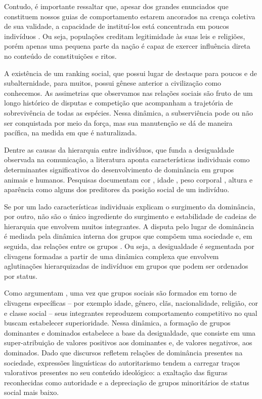\documentclass[
12pt,				%
openright,			%
twoside,			%
a4paper,			%
english,			%
french,				%
spanish,			%
brazil				%
]{abntex2}
\begin{document}
Contudo, é importante ressaltar que, apesar dos grandes enunciados que constituem nossos guias de comportamento estarem ancorados na crença coletiva de sua validade, a capacidade de instituí-los está concentrada em poucos indivíduos \cite{foucault1969archeologie}. Ou seja, populações creditam legitimidade às suas leis e religiões, porém apenas uma pequena parte da nação é capaz de exercer influência direta no conteúdo de constituições e ritos.

A existência de um ranking social, que possui lugar de destaque para poucos e de subalternidade, para muitos, possui gênese anterior a civilização como conhecemos. As assimetrias que observamos nas relações sociais são fruto de um longo histórico de disputas e competição que acompanham a trajetória de sobrevivência de todas as espécies. Nessa dinâmica, a subserviência pode ou não ser conquistada por meio da força, mas sua manutenção se dá de maneira pacífica, na medida em que é naturalizada. 

Dentre as causas da hierarquia entre indivíduos, que funda a desigualdade observada na comunicação, a literatura aponta características individuais como determinantes significativos do desenvolvimento de dominância em grupos animais e humanos. Pesquisas documentam cor \cite{bakker1983determinants}, idade \cite{cote2000dominance, bohlin2001determinants}, peso corporal \cite{morgan2000predictors}, altura \cite{huang2002camera} e aparência \cite{lawson2010looking, lodge2013rationalizing} como alguns dos preditores da posição social de um indivíduo.    

Se por um lado características individuais explicam o surgimento da dominância, por outro, não são o único ingrediente do surgimento e estabilidade de cadeias de hierarquia que envolvem muitos integrantes. A disputa pelo lugar de dominância é mediada pela dinâmica interna dos grupos que compõem uma sociedade \cite{ridgeway1989dominance} e, em seguida, das relações entre os grupos \cite{chase1980social,chase2002individual}. Ou seja, a desigualdade é segmentada por clivagens formadas a partir de uma dinâmica complexa que envolvem aglutinações hierarquizadas de indivíduos em grupos que podem ser ordenados por status.  

Como argumentam , uma vez que grupos sociais são formados em torno de clivagens específicas -- por exemplo idade, gênero, clãs, nacionalidade, religião, cor e classe social -- seus integrantes reproduzem comportamento competitivo no qual buscam estabelecer superioridade. Nessa dinâmica, a formação de grupos dominantes e dominados estabelece a base da desigualdade, que consiste em uma super-atribuição de valores positivos aos dominantes e, de valores negativos, aos dominados. Dado que discursos refletem relações de dominância presentes na sociedade, expressões linguísticas do autoritarismo tendem a carregar traços valorativos presentes no seu conteúdo ideológico: a exaltação das figuras reconhecidas como autoridade e a depreciação de grupos minoritários de status social mais baixo. 
\end{document}
